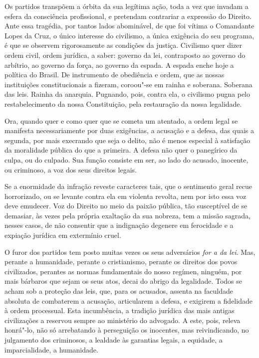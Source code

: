 Os partidos transpõem a órbita da sua legítima
ação, toda a vez que invadam a esfera da consciência profissional, e
pretendam contrariar a expressão do Direito. Ante essa tragédia, por
tantos lados abominável, de que foi vítima o Comandante Lopes da Cruz,
o único interesse do civilismo, a única exigência do seu programa, é
que se observem rigorosamente as condições da justiça. Civilismo quer
dizer ordem civil, ordem jurídica, a saber: governo da lei, 
contraposto ao governo do arbítrio, ao governo da força, ao governo da
espada. A espada enche hoje a política do Brasil. De instrumento de
obediência e ordem, que as nossas instituições constitucionais a
fizeram, coroou"-se em rainha e soberana. Soberana das leis. Rainha da
anarquia. Pugnando, pois, contra ela, o civilismo pugna pelo
restabelecimento da nossa Constituição, pela restauração da nossa legalidade. 

Ora, quando quer e como quer que se cometa um atentado, a
ordem legal se manifesta necessariamente por duas exigências, a
acusação e a defesa, das quais a segunda, por mais execrando que seja o
delito, não é menos especial à satisfação da moralidade pública do
que a primeira. A defesa não quer o panegírico da culpa, ou do culpado.
Sua função consiste em ser, ao lado do acusado, inocente, ou criminoso,
a voz dos seus direitos legais.

 Se a enormidade da infração reveste caracteres tais, que o sentimento
geral recue horrorizado, ou se levante contra ela em violenta
revolta, nem por isto essa voz deve emudecer. Voz do Direito no meio da
paixão pública, tão susceptível de se demasiar, às vezes pela própria
exaltação da sua nobreza, tem a missão sagrada, nesses casos, de não
consentir que a indignação degenere em ferocidade e a expiação
jurídica em extermínio cruel.

 O furor dos partidos tem posto muitas vezes os seus adversários
\textit{for a da lei}. Mas, perante a humanidade, perante o
cristianismo, perante os direitos dos povos civilizados, perantes as
normas fundamentais do nosso regímen, ninguém, por mais bárbaros que
sejam os seus atos, decai do abrigo da legalidade. Todos se acham sob
a proteção das leis, que, para os acusados, assenta na faculdade
absoluta de combaterem a acusação, articularem a defesa, e exigirem a
fidelidade à ordem processual. Esta incumbência, a tradição jurídica
das mais antigas civilizações a reservou sempre ao ministério do
advogado. A este, pois, releva honrá"-lo, não só arrebatando à
perseguição os inocentes, mas reivindicando, no julgamento dos
criminosos, a lealdade às garantias legais, a equidade, a 
imparcialidade, a humanidade.

